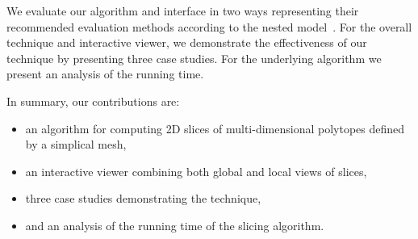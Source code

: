 We evaluate our algorithm and interface in two ways representing their recommended
evaluation methods according to the nested
model~\cite{Munzner:2009}. For the overall technique and
interactive viewer, we demonstrate the effectiveness of our technique by
presenting three case studies. For the underlying algorithm we present an
analysis of the running time. 

In summary, our contributions are:
\begin{itemize}
\item
  an algorithm for computing 2D slices of multi-dimensional polytopes defined by a
  simplical mesh,
\item
  an interactive viewer combining both global and local views of slices,
\item
  three case studies demonstrating the technique,
\item
  and an analysis of the running time of the slicing algorithm.
\end{itemize}

